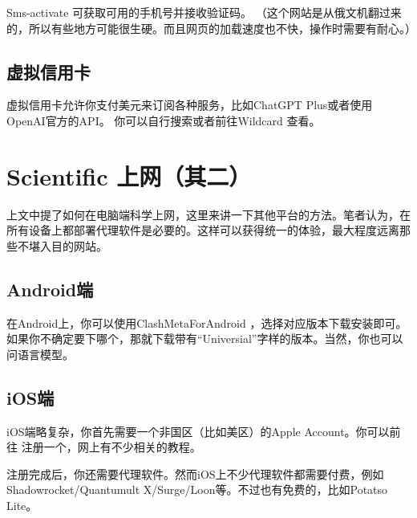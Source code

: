 \textsf{Sms-activate} \href{https://sms-activate.io/cn}{\color{black}\faLink} 可获取可用的手机号并接收验证码。
（这个网站是从俄文机翻过来的，所以有些地方可能很生硬。而且网页的加载速度也不快，操作时需要有耐心。）

\hypertarget{card}{\subsection{虚拟信用卡}}

虚拟信用卡允许你支付美元来订阅各种服务，比如\textsf{ChatGPT Plus}或者使用\textsf{OpenAI}官方的API。
你可以自行搜索或者前往\textsf{Wildcard} \href{http://bewildcard.com/}{\color{black}\faLink} 查看。

\section{Scientific 上网（其二）}
上文中提了如何在电脑端科学上网，这里来讲一下其他平台的方法。笔者认为，在所有设备上都部署代理软件是必要的。这样可以获得统一的体验，最大程度远离那些不堪入目的网站。
\subsection{\textsf{Android}端}

在\textsf{Android}上，你可以使用\textsf{ClashMetaForAndroid} \href{https://github.com/MetaCubeX/ClashMetaForAndroid/releases/tag/v2.11.1}{\color{black}\faLink} ，选择对应版本下载安装即可。
如果你不确定要下哪个，那就下载带有“Universial”字样的版本。当然，你也可以问语言模型。
\subsection{\textsf{iOS}端}

\textsf{iOS}端略复杂，你首先需要一个非国区（比如美区）的\textsf{Apple Account}。你可以前往 \href{https://icloud.com}{\color{black}\faLink} 注册一个，网上有不少相关的教程。

注册完成后，你还需要代理软件。然而\textsf{iOS}上不少代理软件都需要付费，例如\textsf{Shadowrocket}/\textsf{Quantumult X}/\textsf{Surge}/\textsf{Loon}等。不过也有免费的，比如\textsf{Potatso Lite}。


